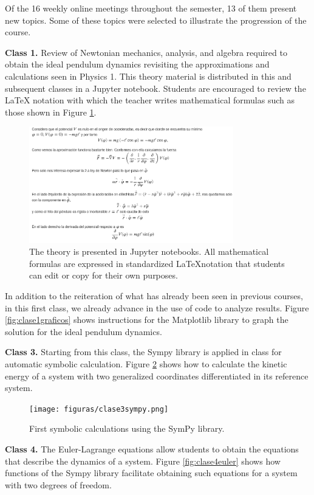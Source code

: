 Of the 16 weekly online meetings throughout the semester, 13 of them present new topics. Some of these topics were selected to illustrate the progression of the course.

\textbf{Class 1.} Review of Newtonian mechanics, analysis, and algebra required to obtain the ideal pendulum dynamics revisiting the approximations and calculations seen in Physics 1. This theory material is distributed in this and subsequent classes in a Jupyter notebook. Students are encouraged to review the LaTeX notation with which the teacher writes mathematical formulas such as those shown in Figure \ref{fig:clase1pendulo}.

\begin{figure}[!ht]
\centering
\includegraphics[width=3.5in]{figuras/clase1péndulo.png}
\caption{The theory is presented in Jupyter notebooks. All mathematical formulas are expressed in standardized \LaTeX notation that students can edit or copy for their own purposes.}
\label{fig:clase1pendulo}
\end{figure}

In addition to the reiteration of what has already been seen in previous courses, in this first class, we already advance in the use of code to analyze results. Figure \ref{fig:clase1graficos} shows instructions for the Matplotlib library to graph the solution for the ideal pendulum dynamics.


\textbf{Class 3.} Starting from this class, the Sympy library is applied in class for automatic symbolic calculation. Figure \ref{fig:clase3sympy} shows how to calculate the kinetic energy of a system with two generalized coordinates differentiated in its reference system.

\begin{figure}[!ht]
\centering
\texttt{[image: figuras/clase3sympy.png]}
\caption{First symbolic calculations using the SymPy library.}
\label{fig:clase3sympy}
\end{figure}

\textbf{Class 4.} The Euler-Lagrange equations allow students to obtain the equations that describe the dynamics of a system. Figure \ref{fig:clase4euler} shows how functions of the Sympy library facilitate obtaining such equations for a system with two degrees of freedom.

